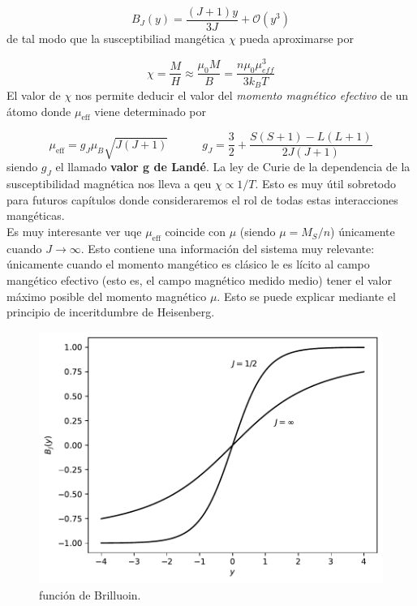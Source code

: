 \documentclass[12pt,a4paper]{book}
\numberwithin{equation}{section}
\numberwithin{figure}{section}
\newcommand{\tquad}{\quad \quad \quad}
\newcommand{\eff}{\mathrm{eff}}
\begin{document}
\begin{equation}
B_J (y) = \frac{(J+1)y}{3J} + \mathcal{O} (y^3)
\end{equation}
de tal modo que la susceptibiliad mangética $\chi$ pueda aproximarse por

\begin{equation}
\chi =\frac{M}{H} \approx \frac{\mu_0 M}{B} = \frac{n \mu_0 \mu_{eff}^3}{3 k_B T}
\end{equation}
El valor de $\chi$ nos permite deducir el valor del \textit{momento magnético efectivo} de un átomo donde $\mu_{\eff}$ viene determinado por

\begin{equation}
\mu_{\eff} = g_J \mu_B \sqrt{J (J+1)} \tquad g_J = \frac{3}{2} + \frac{S(S+1)-L(L+1)}{2J(J+1)}
\end{equation}
siendo $g_J$ el llamado \textbf{valor g de Landé}. La ley de Curie de la dependencia de la susceptibilidad magnética nos lleva a qeu $\chi \varpropto 1/T$. Esto es muy útil sobretodo para futuros capítulos donde consideraremos el rol de todas estas interacciones mangéticas.  \\

Es muy interesante ver uqe $\mu_\eff$ coincide con $\mu$ (siendo $\mu = M_S/n$) únicamente cuando $J\rightarrow \infty$. Esto contiene una información del sistema muy relevante: únicamente cuando el momento mangético es clásico le es lícito al campo mangético efectivo (esto es, el campo magnético medido medio) tener el valor máximo posible del momento magnético $\mu$. Esto se puede explicar mediante el principio de inceritdumbre de Heisenberg.

\begin{figure}[h!]
    \centering
    \includegraphics{Imagenes/02-Brillouin.pdf}
    \caption[scale=1]{función de Brilluoin.}
    \label{Fig:02-04-01}
\end{figure}
\end{document}
